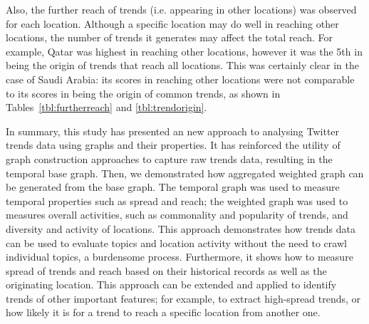 \documentclass{llncs}
\begin{document}
Also, the further reach of trends (i.e. appearing in other locations)
was observed for each location. Although a specific location may do
well in reaching other locations, the number of trends it generates may
affect the total reach. For example, Qatar was highest in reaching
other locations, however it was the 5th in being the origin of trends
that reach all locations. This was certainly clear in the case of Saudi
Arabia: its scores in reaching other locations were not comparable to its
scores in being the origin of common trends, as shown in
Tables~\ref{tbl:furtherreach} and \ref{tbl:trendorigin}.

In summary, this study has presented an new approach to analysing
Twitter trends data using graphs and their properties. It has
reinforced the utility of graph construction approaches to capture raw
trends data, resulting in the temporal base graph. Then, we
demonstrated how aggregated weighted graph can be generated from the
base graph. The temporal graph was used to measure temporal properties
such as spread and reach; the weighted graph was used to measures
overall activities, such as commonality and popularity of trends, and
diversity and activity of locations. This approach demonstrates how
trends data can be used to evaluate topics and location activity
without the need to crawl individual topics, a burdensome
process. Furthermore, it shows how to measure spread of trends and
reach based on their historical records as well as the originating
location. This approach can be extended and applied to identify trends
of other important features; for example, to extract high-spread
trends, or how likely it is for a trend to reach a specific location
from another one.






\end{document}
